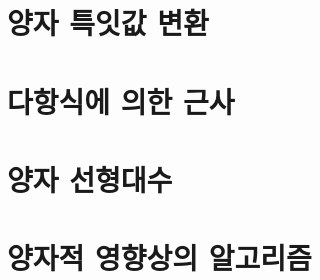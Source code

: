 \documentclass[a4paper,atbegshi,chapter,]{oblivoir}
\begin{document}
\chapter{양자 특잇값 변환}
\chapter{다항식에 의한 근사}
\chapter{양자 선형대수}
\chapter{양자적 영향상의 알고리즘}
\end{document}
